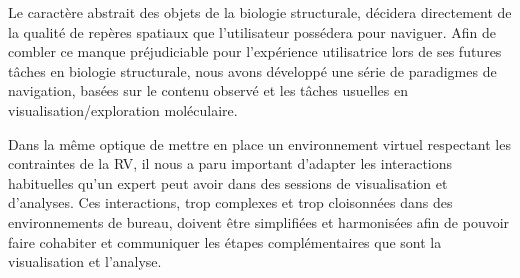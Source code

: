 Le caractère abstrait des objets de la biologie structurale, décidera directement de la qualité de repères spatiaux que l'utilisateur possédera pour naviguer. Afin de combler ce manque préjudiciable pour l'expérience utilisatrice lors de ses futures tâches en biologie structurale, nous avons développé une série de paradigmes de navigation, basées sur le contenu observé et les tâches usuelles en visualisation/exploration moléculaire.

Dans la même optique de mettre en place un environnement virtuel respectant les contraintes de la RV, il nous a paru important d'adapter les interactions habituelles qu'un expert peut avoir dans des sessions de visualisation et d'analyses. Ces interactions, trop complexes et trop cloisonnées dans des environnements de bureau, doivent être simplifiées et harmonisées afin de pouvoir faire cohabiter et communiquer les étapes complémentaires que sont la visualisation et l'analyse. %






